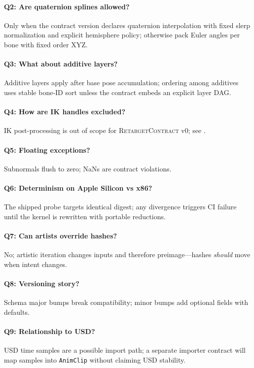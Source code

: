 \documentclass[sigconf,nonacm]{acmart}
\newcommand{\retargetcontract}{\textsc{RetargetContract}}
\newcommand{\animclip}{\texttt{AnimClip}}
\begin{document}
\paragraph{Q2: Are quaternion splines allowed?}
Only when the contract version declares quaternion interpolation with fixed
slerp normalization and explicit hemisphere policy; otherwise pack Euler
angles per bone with fixed order XYZ.

\paragraph{Q3: What about additive layers?}
Additive layers apply after base pose accumulation; ordering among additives
uses stable bone-ID sort unless the contract embeds an explicit layer DAG.

\paragraph{Q4: How are IK handles excluded?}
IK post-processing is out of scope for \retargetcontract{} v0; see
\cite{paper-7-ik-siggraph2027}.

\paragraph{Q5: Floating exceptions?}
Subnormals flush to zero; NaNs are contract violations.

\paragraph{Q6: Determinism on Apple Silicon vs x86?}
The shipped probe targets identical digest; any divergence triggers CI
failure until the kernel is rewritten with portable reductions.

\paragraph{Q7: Can artists override hashes?}
No; artistic iteration changes inputs and therefore preimage---hashes
\emph{should} move when intent changes.

\paragraph{Q8: Versioning story?}
Schema major bumps break compatibility; minor bumps add optional fields with
defaults.

\paragraph{Q9: Relationship to USD?}
USD time samples are a possible import path; a separate importer contract will
map samples into \animclip{} without claiming USD stability.
\end{document}
